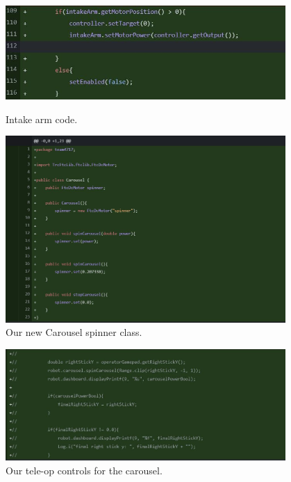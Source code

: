 \begin{figure}[ht]
\centering
\begin{minipage}[b]{.48\textwidth}
  \centering
  \includegraphics[width=0.95\textwidth]{Meetings/November/11-01-21/armMonday1 - Ritam R.JPG}
  \caption{Intake arm code.}
  \label{fig:110121_1}
\end{minipage}%
\hfill%
\begin{minipage}[b]{.48\textwidth}
  \centering
  \includegraphics[width=0.95\textwidth]{Meetings/November/11-01-21/carousel1 - Ritam R.JPG}
  \caption{Our new Carousel spinner class.}
  \label{fig:110121_2}
\end{minipage}
\end{figure}

\begin{figure}[htp]
\centering
\includegraphics[width=0.95\textwidth, angle=0]{Meetings/November/11-01-21/carousel2 - Ritam R.JPG}
\caption{Our tele-op controls for the carousel.}
\label{fig:110121_3}
\end{figure}

